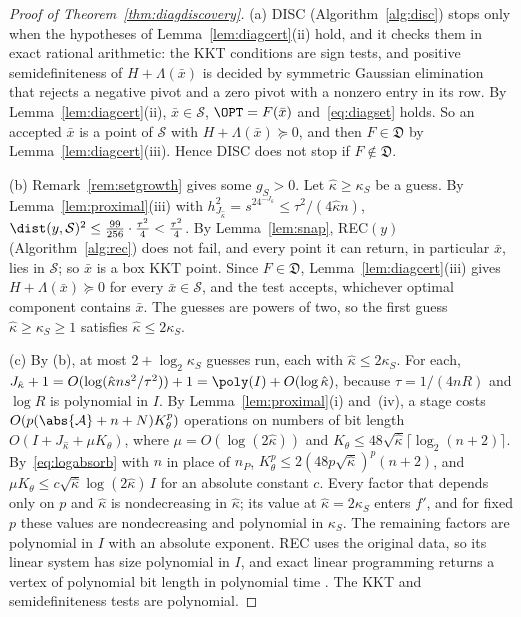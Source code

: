 \begin{proof}[Proof of Theorem~\ref{thm:diagdiscovery}]
(a) DISC (Algorithm~\ref{alg:disc}) stops only when the hypotheses of
Lemma~\ref{lem:diagcert}(ii) hold, and it checks them in exact rational arithmetic: the KKT conditions
are sign tests, and positive semidefiniteness of $H+\Lambda(\bar x)$ is
decided by symmetric Gaussian elimination that rejects a negative pivot and
a zero pivot with a nonzero entry in its row. By
Lemma~\ref{lem:diagcert}(ii), $\bar x\in\mathcal S$, $\OPT=F(\bar x)$
and~\eqref{eq:diagset} holds. So an accepted $\bar x$ is a point of
$\mathcal S$ with $H+\Lambda(\bar x)\succeq0$, and then $F\in\mathfrak D$
by Lemma~\ref{lem:diagcert}(iii). Hence DISC does not stop if
$F\notin\mathfrak D$.

(b) Remark~\ref{rem:setgrowth} gives some $g_S>0$. Let $\hat\kappa\ge\kappa_S$
be a guess. By Lemma~\ref{lem:proximal}(iii) with $h_{J_{\hat\kappa}}^2
=s^24^{-J_{\hat\kappa}}\le\tau^2/(4\hat\kappa n)$,
$\dist(y,\mathcal S)^2\le\frac{99}{256}\cdot\frac{\tau^2}4<\frac{\tau^2}4$. By
Lemma~\ref{lem:snap}, REC$(y)$ (Algorithm~\ref{alg:rec}) does not fail, and every point it can return,
in particular $\bar x$, lies in $\mathcal S$; so $\bar x$ is a box KKT point.
Since $F\in\mathfrak D$, Lemma~\ref{lem:diagcert}(iii) gives
$H+\Lambda(\bar x)\succeq0$ for every $\bar x\in\mathcal S$, and the test
accepts, whichever optimal component contains $\bar x$. The guesses are
powers of two, so the first guess $\hat\kappa\ge\kappa_S\ge1$ satisfies
$\hat\kappa\le2\kappa_S$.

(c) By (b), at most $2+\log_2\kappa_S$ guesses run, each with
$\hat\kappa\le2\kappa_S$. For each,
$J_{\hat\kappa}+1=O(\log(\hat\kappa ns^2/\tau^2))+1=\poly(I)+O(\log\hat\kappa)$,
because $\tau=1/(4nR)$ and $\log R$ is polynomial in $I$. By
Lemma~\ref{lem:proximal}(i) and~(iv), a stage costs
$O(p(\abs{\mathcal A}+n+N)K_\theta^p)$ operations on numbers of bit length
$O(I+J_{\hat\kappa}+\mu K_\theta)$, where $\mu=O(\log(2\hat\kappa))$ and
$K_\theta\le48\sqrt{\hat\kappa}\lceil\log_2(n+2)\rceil$. By~\eqref{eq:logabsorb}
with $n$ in place of $n_P$, $K_\theta^p\le2(48p\sqrt{\hat\kappa})^p(n+2)$, and
$\mu K_\theta\le c\sqrt{\hat\kappa}\log(2\hat\kappa)\,I$ for an absolute
constant $c$. Every factor that depends only on $p$ and $\hat\kappa$ is
nondecreasing in $\hat\kappa$; its value at $\hat\kappa=2\kappa_S$ enters
$f'$, and for fixed $p$ these values are nondecreasing and polynomial in
$\kappa_S$. The remaining factors are polynomial in $I$ with an absolute
exponent. REC uses the original data, so its linear system has size
polynomial in $I$, and exact linear programming returns a vertex of
polynomial bit length in polynomial time
\cite[Theorem~6.4.12]{GrotschelLovaszSchrijver1988}. The KKT and
semidefiniteness tests are polynomial.
\end{proof}

